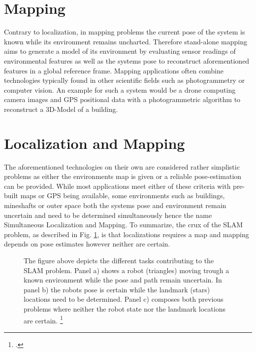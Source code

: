 \section{Mapping}
Contrary to localization, in mapping problems the current pose of the system is known while its environment remains uncharted.
Therefore stand-alone mapping aims to generate a model of its environment by evaluating sensor readings of environmental features as well as the systems pose to reconstruct aforementioned features in a global reference frame. 
Mapping applications often combine technologies typically found in other scientific fields such as photogrammetry or computer vision.
An example for such a system would be a drone computing camera images and GPS positional data with a photogrammetric algorithm to reconstruct a 3D-Model of a building. 


\section{Localization and Mapping}
The aforementioned technologies on their own are considered rather simplistic problems as either the environments map is given or a reliable pose-estimation can be provided. While most applications meet either of these criteria with pre-built maps or GPS being available, some environments such as buildings, mineshafts or outer space both the systems pose and environment remain uncertain and need to be determined simultaneously hence the name Simultaneous Localization and Mapping. 
To summarize, the crux of the SLAM problem, as described in Fig. \ref{fig:slamOverview}, is that localizations requires a map and mapping depends on pose estimates however neither are certain. 





\begin{figure}
	\centering
	
	\caption{
		The figure above depicts the different tasks contributing to the SLAM problem. Panel a) shows a robot (triangles) moving trough a known environment while the pose and path remain uncertain. In panel b) the robots pose is certain while the landmark (stars) locations need to be determined. Panel c) composes both previous problems where neither the robot state nor the landmark locations are certain. \footcite{durrantSlam2006}
	}
	\label{fig:slamOverview}
\end{figure}

